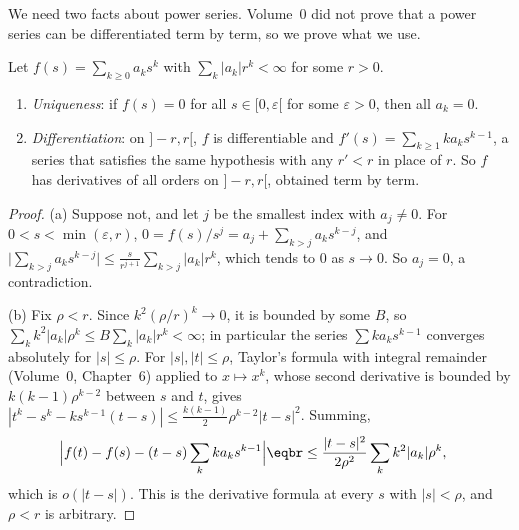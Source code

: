 We need two facts about power series. Volume~0 did not prove that a power series can be differentiated term by term,
so we prove what we use.

\begin{lemma}\label{lem:powerseries}
Let $f(s)=\sum_{k\ge0}a_ks^k$ with $\sum_k|a_k|r^k<\infty$ for some $r>0$.
\begin{enumerate}[label=(\alph*)]
\item \emph{Uniqueness}: if $f(s)=0$ for all $s\in[0,\varepsilon[$ for some $\varepsilon>0$, then all $a_k=0$.
\item \emph{Differentiation}: on $]-r,r[$, $f$ is differentiable and $f'(s)=\sum_{k\ge1}ka_ks^{k-1}$, a series that satisfies the
same hypothesis with any $r'<r$ in place of $r$. So $f$ has derivatives of all orders on $]-r,r[$, obtained term by term.
\end{enumerate}
\end{lemma}
\begin{proof}
(a) Suppose not, and let $j$ be the smallest index with $a_j\ne0$. For $0<s<\min(\varepsilon,r)$,
$0=f(s)/s^j=a_j+\sum_{k>j}a_ks^{k-j}$, and $\bigl|\sum_{k>j}a_ks^{k-j}\bigr|\le\frac s{r^{j+1}}\sum_{k>j}|a_k|r^k$, which tends to $0$ as
$s\to0$. So $a_j=0$, a contradiction.

(b) Fix $\rho<r$. Since $k^2(\rho/r)^k\to0$, it is bounded by some $B$, so $\sum_kk^2|a_k|\rho^k\le B\sum_k|a_k|r^k<\infty$; in particular
the series $\sum ka_ks^{k-1}$ converges absolutely for $|s|\le\rho$. For $|s|,|t|\le\rho$, Taylor's formula with integral
remainder (Volume~0, Chapter~6) applied to $x\mapsto x^k$, whose second derivative is bounded by $k(k-1)\rho^{k-2}$ between $s$
and $t$, gives $|t^k-s^k-ks^{k-1}(t-s)|\le\frac{k(k-1)}2\rho^{k-2}|t-s|^2$. Summing,
\[
\begin{aligned}&\Bigl|f(t)-f(s)-(t-s)\sum_kka_ks^{k-1}\Bigr|\eqbr\le\frac{|t-s|^2}{2\rho^2}\sum_kk^2|a_k|\rho^k,\end{aligned}
\]
which is $o(|t-s|)$. This is the derivative formula at every $s$ with $|s|<\rho$, and $\rho<r$ is arbitrary.
\end{proof}

